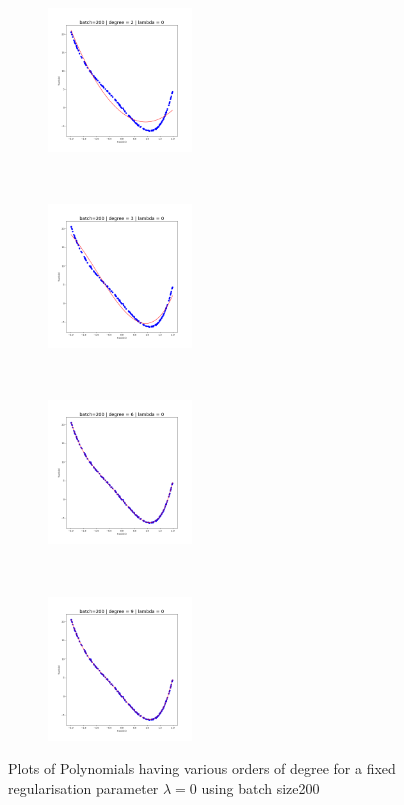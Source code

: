 \begin{figure}[!ht]
    \centering
    \begin{subfigure}[t]{0.25\textwidth}
        \centering
        \includegraphics[height=1.5in]{Task 1 Images/Batch 200/Figure_1.png}
    \end{subfigure}%
    ~ 
    \begin{subfigure}[t]{0.25\textwidth}
        \centering
        \includegraphics[height=1.5in]{Task 1 Images/Batch 200/Figure_2.png}
    \end{subfigure}%
    ~
    \begin{subfigure}[t]{0.25\textwidth}
        \centering
        \includegraphics[height=1.5in]{Task 1 Images/Batch 200/Figure_3.png}
    \end{subfigure}%
    ~ 
    \begin{subfigure}[t]{0.25\textwidth}
        \centering
        \includegraphics[height=1.5in]{Task 1 Images/Batch 200/Figure_4.png}
    \end{subfigure}%
    \caption{Plots of Polynomials having various orders of degree for a fixed regularisation parameter $\lambda = 0$ using batch size200}
    \label{fig:3}
\end{figure}




